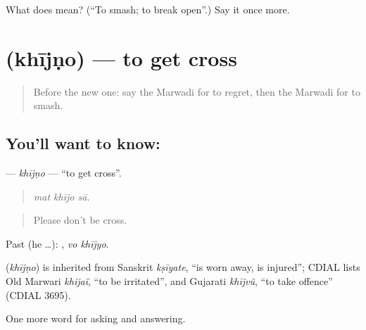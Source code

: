 \begin{tcolorbox}[breakable,colback=teal!4,colframe=teal!35!black,title={Before you move on}]
What does  mean? (\textquotedblleft{}To smash; to break open\textquotedblright{}.) Say it once more.
\end{tcolorbox}
\section[\texorpdfstring{\mw{खीजणो} (khījṇo)}{खीजणो (khījṇo)}]{ (khījṇo) — to get cross}

\label{lesson:MW-C270-khijno}



\begin{quote}
Before the new one: say the Marwadi for to regret, then the Marwadi for to smash.
\end{quote}

\subsection*{You'll want to know: }
\textbf{} — \emph{khījṇo} — \textquotedblleft{}to get cross\textquotedblright{}.

\begin{quote}
  
\end{quote}

\begin{quote}
\emph{mat khījo sā.}
\end{quote}

\begin{quote}
Please don't be cross.
\end{quote}

Past (he …):  , \emph{vo khījyo}.

\begin{cousinweb}
\textbf{} (\emph{khījṇo}) is inherited from Sanskrit \emph{kṣīyate}, \textquotedblleft{}is worn away, is injured\textquotedblright{}; CDIAL lists Old Marwari \emph{khijaï}, \textquotedblleft{}to be irritated\textquotedblright{}, and Gujarati \emph{khījvũ}, \textquotedblleft{}to take offence\textquotedblright{} (CDIAL 3695).
\end{cousinweb}

\begin{grammarlens}[title={What you've built}]
One more word for asking and answering.
\end{grammarlens}


